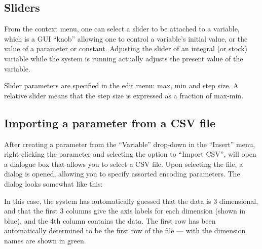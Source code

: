\subsection{Sliders}

From the context menu, one can select a slider to be attached to a
variable, which is a GUI ``knob'' allowing one to control a variable's
initial value, or the value of a parameter or constant. Adjusting the
slider of an integral (or stock) variable while the system is running
actually adjusts the present value of the variable.

Slider parameters are specified in the edit menu: max, min and step
size. A relative slider means that the step size is expressed as a
fraction of max-min.

\subsection{Importing a parameter from a CSV file}\label{CSV import}
\label{Operation:csvImport}

After creating a parameter from the ``Variable'' drop-down in the
``Insert'' menu, right-clicking the parameter and selecting the option
to ``Import CSV'', will open a dialogue box that allows you to select 
a CSV file. Upon selecting the file, a dialog is opened, allowing you to 
specify assorted encoding parameters. The dialog looks somewhat like this:

\begin{center}
\end{center}

In this case, the system has automatically guessed that the data is 3
dimensional, and that the first 3 columns give the axis labels for
each dimension (shown in blue), and the 4th column contains the
data. The first row has been automatically determined to be the first
row of the file --- with the dimension names are shown in green.

